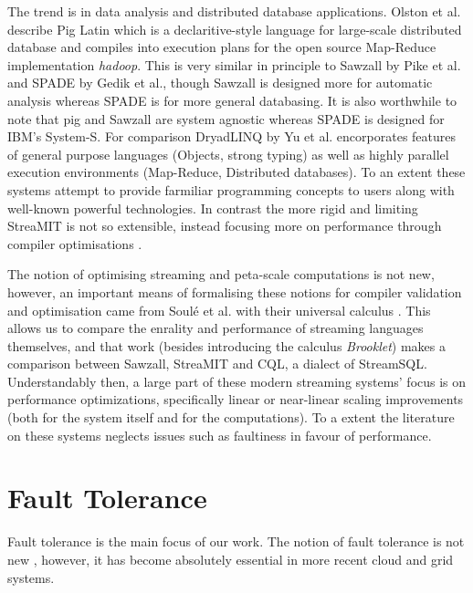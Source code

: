The trend is in data analysis and distributed database applications.
Olston et al. describe Pig Latin \cite{ols08} which is a declaritive-style language for large-scale distributed database and compiles into execution plans for the open source Map-Reduce implementation {\em hadoop}.
This is very similar in principle to Sawzall \cite{pik05} by Pike et al. and SPADE \cite{ged08} by Gedik et al., though Sawzall is designed more for automatic analysis whereas SPADE is for more general databasing.
It is also worthwhile to note that pig and Sawzall are system agnostic whereas SPADE is designed for IBM's System-S.
For comparison DryadLINQ \cite{yu08} by Yu et al. encorporates features of general purpose languages (Objects, strong typing) as well as highly parallel execution environments (Map-Reduce, Distributed databases).
To an extent these systems attempt to provide farmiliar programming concepts to users along with well-known powerful technologies.
In contrast the more rigid and limiting StreaMIT is not so extensible, instead focusing more on performance through compiler optimisations \cite{thies01}.

The notion of optimising streaming and peta-scale computations is not new, however, an important means of formalising these notions for compiler validation and optimisation came from Soul{\'e} et al. with their universal calculus \cite{sou10}.
This allows us to compare the enrality and performance of streaming languages themselves, and that work (besides introducing the calculus {\em Brooklet}) makes a comparison between Sawzall, StreaMIT and CQL, a dialect of StreamSQL.
Understandably then, a large part of these modern streaming systems' focus is on performance optimizations, specifically linear or near-linear scaling improvements (both for the system itself and for the computations).
To a extent the literature on these systems neglects issues such as faultiness in favour of performance.

\section{Fault Tolerance}

Fault tolerance is the main focus of our work.
The notion of fault tolerance is not new \cite{ran75}, however, it has become absolutely essential in more recent cloud and grid systems.

